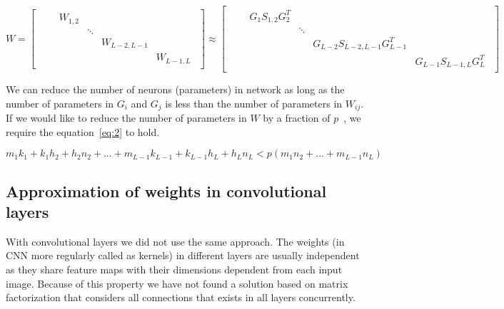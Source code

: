 \documentclass{article} %
\begin{document}
\begin{equation} \label{eq:1}
W = 
\begin{bmatrix} 
\begin{smallmatrix}
& &W_{1,2} & & & \\
& & &\ddots & & \\ 
& & & &W_{L-2,L-1} & \\ 
& & & & &W_{L-1,L} 
\end{smallmatrix}
\end{bmatrix} 
\approx 
\begin{bmatrix} 
\begin{smallmatrix}
& &G_1S_{1,2}G_2^T & & & \\ 
& & &\ddots & & \\ 
& & & &G_{L-2}S_{L-2,L-1}G_{L-1}^T & \\ 
& & & & &G_{L-1}S_{L-1,L}G_L^T 
\end{smallmatrix}
\end{bmatrix}
\end{equation}


We can reduce
the number of neurons (parameters) in network as long as the number of 
parameters
in $G_i$ and $G_j$ is less than the number of parameters in $W_{ij}$. If we 
would
like to reduce the number of parameters in $W$ by a fraction of
$p$~\cite{sainath2013low}, we require the equation~\ref{eq:2} to hold.

\begin{equation} \label{eq:2}
 m_1k_1 + k_1h_2 + h_2n_2 + ... + m_{L-1}k_{L-1} + k_{L-1}h_L + h_Ln_L < 
p(m_1n_2 + ... + m_{L-1}n_L)
\end{equation}

\subsection{Approximation of weights in convolutional layers}

With convolutional layers we did not use the same approach. The weights (in CNN 
more regularly called as kernels) in different layers are 
usually independent as they share feature maps with their dimensions dependent 
from each input image. Because of this property we have not found a solution 
based on matrix factorization that considers all connections that exists in all 
layers concurrently. 
\end{document}
